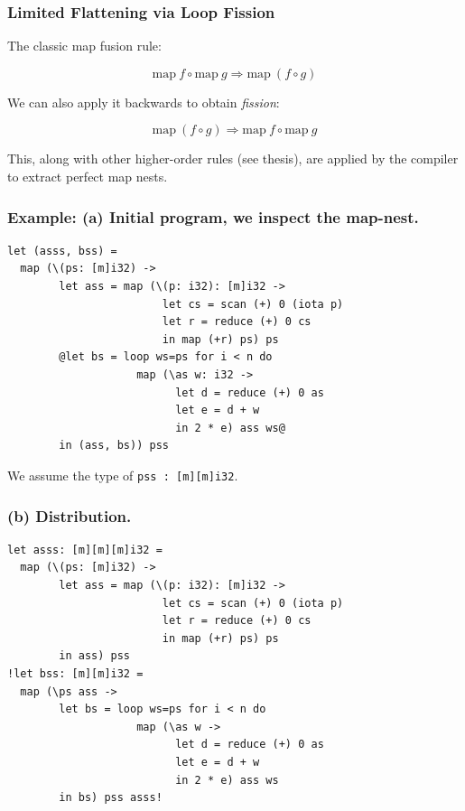 \documentclass[rgb,dvipsnames]{beamer}
\begin{document}
\begin{frame}
  \frametitle{Limited Flattening via Loop Fission}

  The classic map fusion rule:

  \[
    \text{map}~f \circ \text{map}~g \Rightarrow \text{map}~(f \circ g)
  \]

\vspace{1cm}
\pause
We can also apply it backwards to obtain \textit{fission}:

  \[
     \text{map}~(f \circ g) \Rightarrow \text{map}~f \circ \text{map}~g
  \]

  This, along with other higher-order rules (see thesis), are applied
  by the compiler to extract perfect map nests.

\end{frame}

\begin{frame}[t,fragile]
\frametitle{Example: (a) Initial program, we inspect the map-nest.}

  \begin{lstlisting}[basicstyle=\sffamily\footnotesize]
let (asss, bss) =
  map (\(ps: [m]i32) ->
        let ass = map (\(p: i32): [m]i32 ->
                        let cs = scan (+) 0 (iota p)
                        let r = reduce (+) 0 cs
                        in map (+r) ps) ps
        @let bs = loop ws=ps for i < n do
                    map (\as w: i32 ->
                          let d = reduce (+) 0 as
                          let e = d + w
                          in 2 * e) ass ws@
        in (ass, bs)) pss
\end{lstlisting}

We assume the type of \texttt{pss : [m][m]i32}.
\end{frame}

\begin{frame}[t,fragile]
\frametitle{(b) Distribution.}

\begin{lstlisting}[basicstyle=\sffamily\footnotesize]
let asss: [m][m][m]i32 =
  map (\(ps: [m]i32) ->
        let ass = map (\(p: i32): [m]i32 ->
                        let cs = scan (+) 0 (iota p)
                        let r = reduce (+) 0 cs
                        in map (+r) ps) ps
        in ass) pss
!let bss: [m][m]i32 =
  map (\ps ass ->
        let bs = loop ws=ps for i < n do
                    map (\as w ->
                          let d = reduce (+) 0 as
                          let e = d + w
                          in 2 * e) ass ws
        in bs) pss asss!
\end{lstlisting}
\end{frame}
\end{document}
